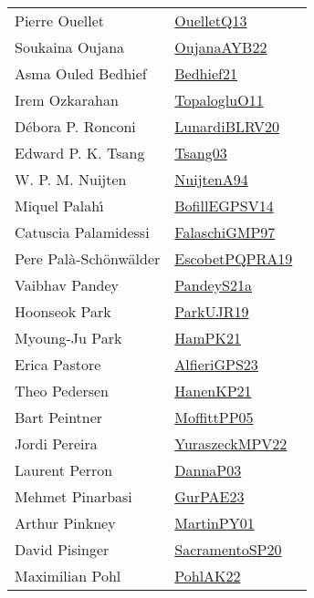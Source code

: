 {\begin{longtable}{p{4cm}p{20cm}}
Pierre Ouellet & \href{works/OuelletQ13.pdf}{OuelletQ13}~\cite{OuelletQ13}\\
Soukaina Oujana & \href{works/OujanaAYB22.pdf}{OujanaAYB22}~\cite{OujanaAYB22}\\
Asma Ouled Bedhief & \href{works/Bedhief21.pdf}{Bedhief21}~\cite{Bedhief21}\\
Irem Ozkarahan & \href{works/TopalogluO11.pdf}{TopalogluO11}~\cite{TopalogluO11}\\
D{\'{e}}bora P. Ronconi & \href{works/LunardiBLRV20.pdf}{LunardiBLRV20}~\cite{LunardiBLRV20}\\
Edward P. K. Tsang & \href{works/Tsang03.pdf}{Tsang03}~\cite{Tsang03}\\
W. P. M. Nuijten & \href{works/NuijtenA94.pdf}{NuijtenA94}~\cite{NuijtenA94}\\
Miquel Palah{\'{\i}} & \href{works/BofillEGPSV14.pdf}{BofillEGPSV14}~\cite{BofillEGPSV14}\\
Catuscia Palamidessi & \href{works/FalaschiGMP97.pdf}{FalaschiGMP97}~\cite{FalaschiGMP97}\\
Pere Pal{\`{a}}{-}Sch{\"{o}}nw{\"{a}}lder & \href{works/EscobetPQPRA19.pdf}{EscobetPQPRA19}~\cite{EscobetPQPRA19}\\
Vaibhav Pandey & \href{works/PandeyS21a.pdf}{PandeyS21a}~\cite{PandeyS21a}\\
Hoonseok Park & \href{works/ParkUJR19.pdf}{ParkUJR19}~\cite{ParkUJR19}\\
Myoung-Ju Park & \href{works/HamPK21.pdf}{HamPK21}~\cite{HamPK21}\\
Erica Pastore & \href{works/AlfieriGPS23.pdf}{AlfieriGPS23}~\cite{AlfieriGPS23}\\
Theo Pedersen & \href{works/HanenKP21.pdf}{HanenKP21}~\cite{HanenKP21}\\
Bart Peintner & \href{works/MoffittPP05.pdf}{MoffittPP05}~\cite{MoffittPP05}\\
Jordi Pereira & \href{works/YuraszeckMPV22.pdf}{YuraszeckMPV22}~\cite{YuraszeckMPV22}\\
Laurent Perron & \href{works/DannaP03.pdf}{DannaP03}~\cite{DannaP03}\\
Mehmet Pinarbasi & \href{works/GurPAE23.pdf}{GurPAE23}~\cite{GurPAE23}\\
Arthur Pinkney & \href{works/MartinPY01.pdf}{MartinPY01}~\cite{MartinPY01}\\
David Pisinger & \href{works/SacramentoSP20.pdf}{SacramentoSP20}~\cite{SacramentoSP20}\\
Maximilian Pohl & \href{works/PohlAK22.pdf}{PohlAK22}~\cite{PohlAK22}\\

\end{longtable}}
